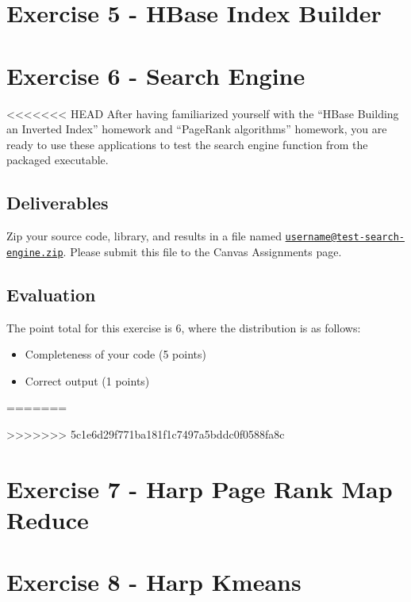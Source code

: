 \chapter{Exercise 5 - HBase Index Builder}\label{project-5}



\chapter{Exercise 6 - Search Engine  }\label{project-6}

<<<<<<< HEAD
After having familiarized yourself with the ``HBase Building an Inverted
Index'' homework and ``PageRank algorithms'' homework, you are ready to
use these applications to test the search engine function from the
packaged executable.

\section*{Deliverables}\label{deliverables}

Zip your source code, library, and results in a file named
\href{mailto:username@test-search-engine.zip}{\nolinkurl{username@test-search-engine.zip}}.
Please submit this file to the Canvas Assignments page.

\FILENAME

\section*{Evaluation}\label{evaluation}

The point total for this exercise is 6, where the distribution is as
follows:

\begin{itemize}
\tightlist
\item
  Completeness of your code (5 points)
\item
  Correct output (1 points)
\end{itemize}




=======

>>>>>>> 5c1e6d29f771ba181f1c7497a5bddc0f0588fa8c

\chapter{Exercise 7 - Harp Page Rank Map Reduce}\label{project-7}



\chapter{Exercise 8 - Harp Kmeans}\label{project-8}



